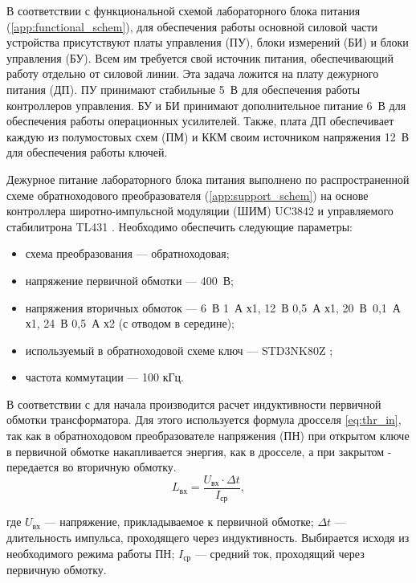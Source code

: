 \documentclass[utf8x, 14pt, oneside, a4paper]{article}
\begin{document}
		В соответствии с функциональной схемой лабораторного блока питания (\ref{app:functional_schem}), для обеспечения работы основной силовой части устройства присутствуют платы управления (ПУ), блоки измерений (БИ) и блоки управления (БУ). Всем им требуется свой источник питания, обеспечивающий работу отдельно от силовой линии. Эта задача ложится на плату дежурного питания (ДП). ПУ принимают стабильные 5~В для обеспечения работы контроллеров управления. БУ и БИ принимают дополнительное питание 6~В для обеспечения работы операционных усилителей. Также, плата ДП обеспечивает каждую из полумостовых схем (ПМ) и ККМ своим источником напряжения 12~В для обеспечения работы ключей.
		
		Дежурное питание лабораторного блока питания выполнено по распространенной схеме обратноходового преобразователя (\ref{app:support_schem}) на основе контроллера широтно-импульсной модуляции (ШИМ) UC3842 \cite{bib:UC3842} и управляемого стабилитрона TL431 \cite{bib:TL431}. Необходимо обеспечить следующие параметры:
		
		\begin{itemize}
			\item схема преобразования --- обратноходовая;
			\item напряжение первичной обмотки --- 400~В;
			\item напряжения вторичных обмоток --- 6~В 1~А х1, 12~В 0,5~А х1, 20~В~0,1~А х1, 24~В 0,5~А х2 (с отводом в середине);
			\item используемый в обратноходовой схеме ключ --- STD3NK80Z \cite{bib:STD3NK80Z};
			\item частота коммутации --- 100 кГц.
		\end{itemize}
	
		В соответствии с \cite{bib:myek} для начала производится расчет индуктивности первичной обмотки трансформатора. Для этого используется формула дросселя \ref{eq:thr_in}, так как в обратноходовом преобразователе напряжения (ПН) при открытом ключе в первичной обмотке накапливается энергия, как в дросселе, а при закрытом - передается во вторичную обмотку.
		\begin{equation}
			L_{\text{вх}} = \frac{U_{\text{вх}} \cdot {\Delta}t}{I_{\text{ср}}},
			\label{eq:thr_in}
		\end{equation}
	
		\noindent где $U_{\text{вх}}$ --- напряжение, прикладываемое к первичной обмотке; ${\Delta}t$ --- длительность импульса, проходящего через индуктивность. Выбирается исходя из необходимого режима работы ПН; $I_{\text{ср}}$ --- средний ток, проходящий через первичную обмотку.
		
\end{document}
